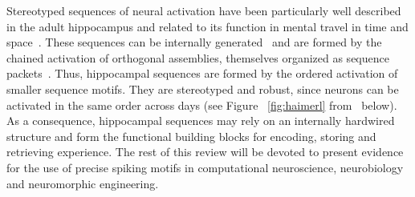 \documentclass[brainsci, %
               review,submit,pdftex,moreauthors%
               ]{Definitions/mdpi}
\begin{document}
Stereotyped sequences of neural activation have been particularly well described in the adult hippocampus and related to its function in mental travel in time and space~\citep{buzsaki_space_2018}. These sequences can be internally generated~\citep{pastalkova_internally_2008,villette_internally_2015} and are formed by the chained activation of orthogonal assemblies, themselves organized as sequence packets~\citep{malvache_awake_2016}. Thus, hippocampal sequences are formed by the ordered activation of smaller sequence motifs. They are stereotyped and robust, since neurons can be activated in the same order across days (see Figure
~\ref{fig:haimerl} from~\citep{haimerl_internal_2019} below). As a consequence, hippocampal sequences may rely on an internally hardwired structure and form the functional building blocks for encoding, storing and retrieving experience.
The rest of this review will be devoted to present evidence for the use of precise spiking motifs in computational neuroscience, neurobiology and neuromorphic engineering.

%
\end{document}
